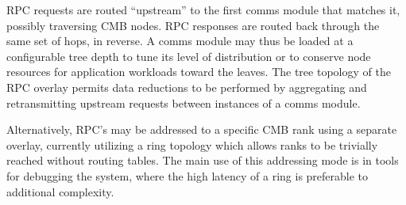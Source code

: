 RPC requests are routed ``upstream'' to the first comms module that matches
it, possibly traversing CMB nodes.  RPC responses are routed back through
the same set of hops, in reverse.  A comms module may thus be loaded
at a configurable tree depth to tune its level of distribution
or to conserve node resources for application workloads toward the leaves.
The tree topology of the RPC overlay permits data reductions to be performed by
aggregating and retransmitting upstream requests between instances of
a comms module.

Alternatively, RPC's may be addressed to a specific CMB rank using a
separate overlay, currently utilizing a ring topology which allows
ranks to be trivially reached without routing tables.  The main use
of this addressing mode is in tools for debugging the system,
where the high latency of a ring is preferable to additional complexity.

%
